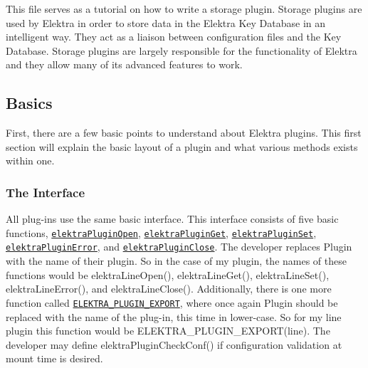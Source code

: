 This file serves as a tutorial on how to write a storage plugin. Storage plugins are used by Elektra in order to store data in the Elektra Key Database in an intelligent way. They act as a liaison between configuration files and the Key Database. Storage plugins are largely responsible for the functionality of Elektra and they allow many of its advanced features to work.

\subsection*{Basics}

First, there are a few basic points to understand about Elektra plugins. This first section will explain the basic layout of a plugin and what various methods exists within one.

\subsubsection*{The Interface}

All plug-\/ins use the same basic interface. This interface consists of five basic functions, \href{http://doc.libelektra.org/api/current/html/group__plugin.html#ga1a72ac76b618943677e00ed7ab50b372}{\tt elektra\+Plugin\+Open}, \href{http://doc.libelektra.org/api/current/html/group__plugin.html#ga2f14a12b205687a31e6fd0645470ec69}{\tt elektra\+Plugin\+Get}, \href{http://doc.libelektra.org/api/current/html/group__plugin.html#ga01dd4018e48c3a091cb03940a7a8341f}{\tt elektra\+Plugin\+Set}, \href{http://doc.libelektra.org/api/current/html/group__plugin.html#gab0f8a88ee9868fb698b4e3040a70e000}{\tt elektra\+Plugin\+Error}, and \href{http://doc.libelektra.org/api/current/html/group__plugin.html#gaed8aeda2b2beab1b8052f8a64c601754}{\tt elektra\+Plugin\+Close}. The developer replaces {\ttfamily Plugin} with the name of their plugin. So in the case of my plugin, the names of these functions would be {\ttfamily elektra\+Line\+Open()}, {\ttfamily elektra\+Line\+Get()}, {\ttfamily elektra\+Line\+Set()}, {\ttfamily elektra\+Line\+Error()}, and {\ttfamily elektra\+Line\+Close()}. Additionally, there is one more function called \href{http://doc.libelektra.org/api/current/html/group__plugin.html#gabe78724d2d477eef39997fd9b85bff16}{\tt E\+L\+E\+K\+T\+R\+A\+\_\+\+P\+L\+U\+G\+I\+N\+\_\+\+E\+X\+P\+O\+R\+T}, where once again {\ttfamily Plugin} should be replaced with the name of the plug-\/in, this time in lower-\/case. So for my line plugin this function would be {\ttfamily E\+L\+E\+K\+T\+R\+A\+\_\+\+P\+L\+U\+G\+I\+N\+\_\+\+E\+X\+P\+O\+R\+T(line)}. The developer may define elektra\+Plugin\+Check\+Conf() if configuration validation at mount time is desired.

